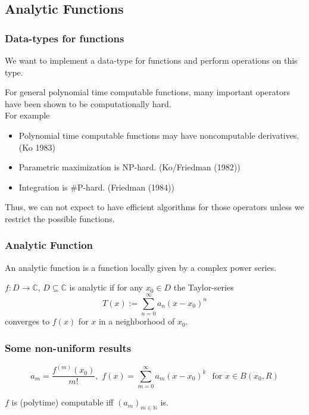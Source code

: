 \documentclass[handout,xcolor=pdftex,dvipsnames,table]{beamer}
\newcommand{\N}{\ensuremath{\mathbb{N}}}
\newcommand{\C}{\ensuremath{\mathbb{C}}}
\begin{document}
\subsection{Analytic Functions}
\begin{frame}
\frametitle{Data-types for functions}
We want to implement a data-type for functions and perform operations on this type.
\pause
\begin{fact}
For general polynomial time computable functions, many important operators have been shown to be computationally hard.\\
For example
\pause
\begin{itemize}[<+->]
\item Polynomial time computable functions may have noncomputable derivatives. (Ko 1983)
\item Parametric maximization is NP-hard. (Ko/Friedman (1982))
\item Integration is \#P-hard. (Friedman (1984))
\end{itemize}
\end{fact}
\pause
Thus, we can not expect to have efficient algorithms for those operators unless we restrict the possible functions.
\end{frame}
\begin{frame}
\frametitle{Analytic Function}
An analytic function is a function locally given by a complex power series.\\
\begin{definition}
$f : D \to \C $, $D \subseteq \C$ is analytic if for any $x_0 \in D$ the Taylor-series
$$ T(x) := \sum^\infty_{n=0} a_n(x-x_0)^n$$
converges to $f(x)$ for $x$ in a neighborhood of $x_0$.  
\end{definition}
\end{frame}
\begin{frame}
\frametitle{Some non-uniform results}

$$a_m =\frac{f^{(m)}(x_0)}{m!} 
, \,\, f(x) = \sum_{m=0}^\infty a_m(x-x_0)^k \,\ \text{ for } x \in B(x_0,R)
$$
\vfill
\begin{theorem}
$f$ is (polytime) computable iff $(a_m)_{m \in \N}$ is.
\end{theorem}
\end{frame}
\end{document}
